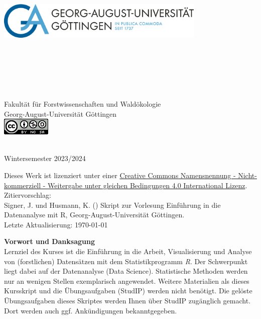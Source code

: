 \begin{titlepage}
\begin{center}
\vfill
\includegraphics[width=10cm,height=8cm]{misc/fig/logo-uni-neu.png}
~\\[0.4cm]

Fakultät für Forstwissenschaften und Waldökologie \\
Georg-August-Universität Göttingen \\[1.2cm]
\includegraphics{misc/fig/logo_cc.png}
\vfill

\hRule ~\\[0.5cm]
{\large Wintersemester 2023/2024}\\


\end{center}
\newpage
\vspace*{\fill}
Dieses Werk ist lizenziert unter einer \href{https://creativecommons.org/licenses/by-nc-sa/4.0/}{Creative Commons Namensnennung - Nicht-kommerziell - Weitergabe unter gleichen Bedingungen 4.0 International Lizenz}. \\[1cm]
Zitiervorschlag: \\
Signer, J. und Husmann, K. (\the\year{}) Skript zur Vorlesung Einführung in die Datenanalyse mit R, Georg-August-Universität Göttingen.
~\\[1cm]
Letzte Aktualisierung: \today

\newpage

{\bf Vorwort und Danksagung} \\[0.5cm]

Lernziel des Kurses ist die Einführung in die Arbeit, Visualisierung und Analyse von (forstlichen) Datensätzen
mit dem Statistikprogramm \textit{R}. Der Schwerpunkt liegt dabei auf der Datenanalyse (Data Science). Statistische Methoden werden nur an wenigen Stellen exemplarisch angewendet. Weitere Materialien als dieses Kursskript und die Übungsaufgaben (StudIP) werden nicht benötigt. Die gelöste Übungsaufgaben dieses Skriptes werden Ihnen über StudIP zugänglich gemacht. Dort werden auch ggf. Ankündigungen bekanntgegeben. 


\end{titlepage}
